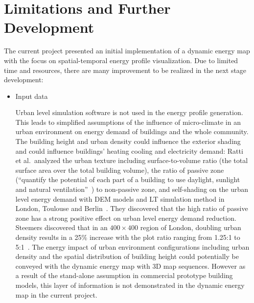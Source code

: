 \section{Limitations and Further Development}
The current project presented an initial implementation of a dynamic
energy map with the focus on spatial-temporal energy profile
visualization. Due to limited time and resources, there are many
improvement to be realized in the next stage development:

\begin{itemize}
\item Input data

  Urban level simulation software is not used in the energy profile
  generation. This leads to simplified assumptions of the influence of
  micro-climate in an urban environment on energy demand of buildings
  and the whole community. The building height and urban density could
  influence the exterior shading and could influence buildings'
  heating cooling and electricity demand: Ratti et al.\ analyzed the
  urban texture including surface-to-volume ratio (the total surface
  area over the total building volume), the ratio of passive zone
  (``quantify the potential of each part of a building to use
  daylight, sunlight and natural ventilation''~\cite{Ratti2005762}) to
  non-passive zone, and self-shading on the urban level energy demand
  with DEM models and LT simulation method in London, Toulouse and
  Berlin~\cite{Ratti2005762}. They discovered that the high ratio of
  passive zone has a strong positive effect on urban level energy
  demand reduction. Steemers discovered that in an $400 \times 400$
  region of London, doubling urban density results in a 25\% increase
  with the plot ratio ranging from 1.25:1 to
  5:1~\cite{Steemers20033}. The energy impact of urban environment
  configurations including urban density and the spatial distribution
  of building height could potentially be conveyed with the dynamic
  energy map with 3D map sequences. However as a result of the
  stand-alone assumption in commercial prototype building models, this
  layer of information is not demonstrated in the dynamic energy map
  in the current project.


\end{itemize}
